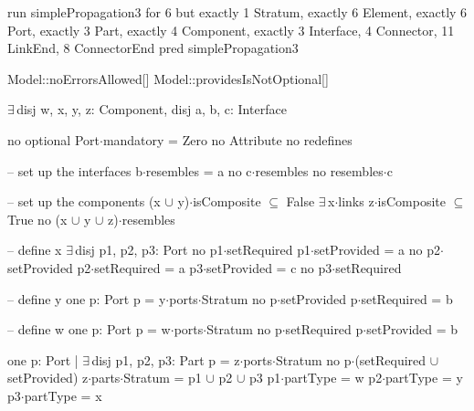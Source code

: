 run simplePropagation3 for 6 but exactly 1 Stratum, exactly 6 Element, exactly 6 Port, exactly 3 Part, exactly 4 Component, exactly 3 Interface, 4 Connector, 11 LinkEnd, 8 ConnectorEnd
pred simplePropagation3
{
  Model::noErrorsAllowed[]
  Model::providesIsNotOptional[]

  $\exists\,$disj w, x, y, z: Component,
       disj a, b, c: Interface
  {
    no optional
    Port$\cdot$mandatory = Zero
    no Attribute
    no redefines
  
    -- set up the interfaces
    b$\cdot$resembles = a
    no c$\cdot$resembles
    no resembles$\cdot$c
  
    -- set up the components
    (x $\cup$ y)$\cdot$isComposite $\subseteq$ False
    $\exists\,$x$\cdot$links
    z$\cdot$isComposite $\subseteq$ True
    no (x $\cup$ y $\cup$ z)$\cdot$resembles
    
    -- define x
    $\exists\,$disj p1, p2, p3: Port
    {
      no p1$\cdot$setRequired
      p1$\cdot$setProvided = a
      no p2$\cdot$setProvided
      p2$\cdot$setRequired = a
      p3$\cdot$setProvided = c
      no p3$\cdot$setRequired
    }
    
    -- define y
    one p: Port
    {
      p = y$\cdot$ports$\cdot$Stratum
      no p$\cdot$setProvided
      p$\cdot$setRequired = b
    }
    
    -- define w
    one p: Port
    {
      p = w$\cdot$ports$\cdot$Stratum
      no p$\cdot$setRequired
      p$\cdot$setProvided = b
    }
    
    one p: Port | $\exists\,$disj p1, p2, p3: Part
    {
      p = z$\cdot$ports$\cdot$Stratum
      no p$\cdot$(setRequired $\cup$ setProvided)
      z$\cdot$parts$\cdot$Stratum = p1 $\cup$ p2 $\cup$ p3
      p1$\cdot$partType = w
      p2$\cdot$partType = y
      p3$\cdot$partType = x
    }
  }
}

